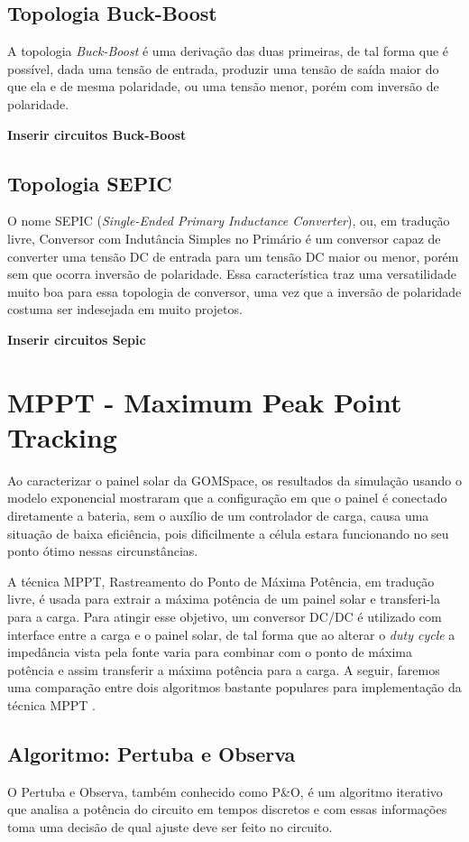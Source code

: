 \subsection{Topologia Buck-Boost}
A topologia \textit{Buck-Boost} é uma derivação das duas primeiras, de tal forma que é possível, dada uma tensão de entrada, produzir uma tensão de saída maior do que ela e de mesma polaridade, ou uma tensão menor, porém com inversão de polaridade.

\textbf{ Inserir circuitos Buck-Boost }

\subsection{Topologia SEPIC}
O nome SEPIC (\textit{Single-Ended Primary Inductance Converter}), ou, em tradução livre, Conversor com Indutância Simples no Primário é um conversor capaz de converter uma tensão DC de entrada para um tensão DC maior ou menor, porém sem que ocorra inversão de polaridade. Essa característica traz uma versatilidade muito boa para essa topologia de conversor, uma vez que a inversão de polaridade costuma ser indesejada em muito projetos. 

\textbf{ Inserir circuitos Sepic }


\section{MPPT - Maximum Peak Point Tracking}\label{mppt_revision}
Ao caracterizar o painel solar da GOMSpace, os resultados da simulação usando o modelo exponencial mostraram que a configuração em que o painel é conectado diretamente a bateria, sem o auxílio de um controlador de carga, causa uma situação de baixa eficiência, pois dificilmente a célula estara funcionando no seu ponto ótimo nessas circunstâncias.

A técnica MPPT, Rastreamento do Ponto de Máxima Potência, em tradução livre, é usada para extrair a máxima potência de um painel solar e transferi-la para a carga. Para atingir esse objetivo, um conversor DC/DC é utilizado com interface entre a carga e o painel solar, de tal forma que ao alterar o \textit{duty cycle} a impedância vista pela fonte varia para combinar com o ponto de máxima potência e assim transferir a máxima potência para a carga. A seguir, faremos uma comparação entre dois algoritmos bastante populares para implementação da técnica MPPT \cite{mppt_comparison}.

\subsection{Algoritmo: Pertuba e Observa}
O Pertuba e Observa, também conhecido como P\&O, é um algoritmo iterativo que analisa a potência do circuito em tempos discretos e com essas informações toma uma decisão de qual ajuste deve ser feito no circuito. 

